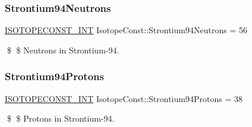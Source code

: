 \subsubsection{\texorpdfstring{Strontium94\+Neutrons}{Strontium94Neutrons}}
{\footnotesize\ttfamily \mbox{\hyperlink{group___isotope_const-_macros_ga5f18360b3e99483a35c32d789e62621c}{I\+S\+O\+T\+O\+P\+E\+C\+O\+N\+S\+T\+\_\+\+I\+NT}} Isotope\+Const\+::\+Strontium94\+Neutrons = 56}

\$ \$ Neutrons in Strontium-\/94. \mbox{\label{group___isotope_const-_strontium-_sr94_gab2cd8ee4c4c819e8f72686067dec596e}} 
\subsubsection{\texorpdfstring{Strontium94\+Protons}{Strontium94Protons}}
{\footnotesize\ttfamily \mbox{\hyperlink{group___isotope_const-_macros_ga5f18360b3e99483a35c32d789e62621c}{I\+S\+O\+T\+O\+P\+E\+C\+O\+N\+S\+T\+\_\+\+I\+NT}} Isotope\+Const\+::\+Strontium94\+Protons = 38}

\$ \$ Protons in Strontium-\/94. 